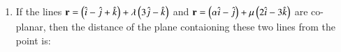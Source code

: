 \documentclass[journal,12pt,onecolumn]{IEEEtran}
\theoremstyle{remark}
\begin{document}
\begin{enumerate}
\item If the lines $\mathbf{r}=\left(\hat{i}-\hat{j}+\hat{k}\right)+\lambda\left(3\hat{j}-\hat{k}\right)$ and $\mathbf{r}=\left(\alpha\hat{i}-\hat{j}\right)+\mu\left(2\hat{i}-3\hat{k}\right)$ are co-planar, then the distance of the plane contaioning these two lines from the point  is:

\hfill{}
\begin{enumerate}
\end{enumerate}

\end{enumerate}
\end{document}
